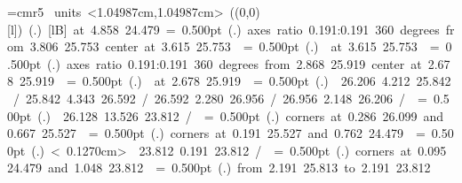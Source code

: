\font\thinlinefont=cmr5
%
\begingroup\makeatletter\ifx\SetFigFont\undefined%
\gdef\SetFigFont#1#2#3#4#5{%
  \reset@font\fontsize{#1}{#2pt}%
  \fontfamily{#3}\fontseries{#4}\fontshape{#5}%
  \selectfont}%
\fi\endgroup%
\mbox{\beginpicture
\setcoordinatesystem units <1.04987cm,1.04987cm>
\unitlength=1.04987cm
\linethickness=1pt
\setplotsymbol ({\makebox(0,0)[l]{\tencirc{}}})
\setshadesymbol ({\thinlinefont .})
\setlinear
%
%
 [lB] at  4.858 24.479
%
%
\linethickness= 0.500pt
\setplotsymbol ({\thinlinefont .})
{\color[rgb]{0,0,0}\ellipticalarc axes ratio  0.191:0.191  360 degrees 
	from  3.806 25.753 center at  3.615 25.753
}%
%
%
\linethickness= 0.500pt
\setplotsymbol ({\thinlinefont .})
{\color[rgb]{0,0,0} at  3.615 25.753
}%
%
%
\linethickness= 0.500pt
\setplotsymbol ({\thinlinefont .})
{\color[rgb]{0,0,0}\ellipticalarc axes ratio  0.191:0.191  360 degrees 
	from  2.868 25.919 center at  2.678 25.919
}%
%
%
\linethickness= 0.500pt
\setplotsymbol ({\thinlinefont .})
{\color[rgb]{0,0,0} at  2.678 25.919
}%
%
%
\linethickness= 0.500pt
\setplotsymbol ({\thinlinefont .})
{\color[rgb]{0,0,0} 26.206  4.212 25.842 /
 25.842  4.343 26.592 /
 26.592  2.280 26.956 /
 26.956  2.148 26.206 /
}%
%
%
\linethickness= 0.500pt
\setplotsymbol ({\thinlinefont .})
{\color[rgb]{0,0,0} 26.128 13.526 23.812 /
}%
%
%
\linethickness= 0.500pt
\setplotsymbol ({\thinlinefont .})
{\color[rgb]{0,0,0}\color[rgb]{0,0,0}\putrectangle corners at  0.286 26.099 and  0.667 25.527
}%
%
%
\linethickness= 0.500pt
\setplotsymbol ({\thinlinefont .})
{\color[rgb]{0,0,0}\color[rgb]{0,0,0}\putrectangle corners at  0.191 25.527 and  0.762 24.479
}%
%
%
\linethickness= 0.500pt
\setplotsymbol ({\thinlinefont .})
\setdashes < 0.1270cm>
{\color[rgb]{0,0,0} 23.812  0.191 23.812 /
}%
%
%
\linethickness= 0.500pt
\setplotsymbol ({\thinlinefont .})
\setsolid
{\color[rgb]{0,0,0}\color[rgb]{0,0,0}\putrectangle corners at  0.095 24.479 and  1.048 23.812
}%
%
%
\linethickness= 0.500pt
\setplotsymbol ({\thinlinefont .})
{\color[rgb]{0,0,0}\putrule from  2.191 25.813 to  2.191 23.812
}}
